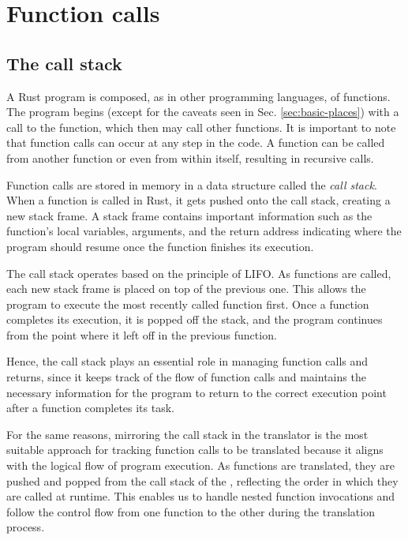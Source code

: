 \section{Function calls}

\subsection{The call stack}

A Rust program is composed, as in other programming languages, of functions.
The program begins (except for the caveats seen in Sec. \ref{sec:basic-places})
with a call to the  function, which then may call other functions.
It is important to note that function calls can occur at any step in the code.
A function can be called from another function or even from within itself, resulting in recursive calls.

Function calls are stored in memory in a data structure called the \emph{call stack}.
When a function is called in Rust, it gets pushed onto the call stack, creating a new stack frame.
A stack frame contains important information such as the function's local variables, arguments,
and the return address indicating where the program should resume once the function finishes its execution.

The call stack operates based on the principle of \acrfull{LIFO}.
As functions are called, each new stack frame is placed on top of the previous one.
This allows the program to execute the most recently called function first.
Once a function completes its execution, it is popped off the stack,
and the program continues from the point where it left off in the previous function.

Hence, the call stack plays an essential role in managing function calls and returns,
since it keeps track of the flow of function calls and maintains the necessary information
for the program to return to the correct execution point after a function completes its task.

For the same reasons, mirroring the call stack in the translator
is the most suitable approach for tracking function calls to be translated
because it aligns with the logical flow of program execution.
As functions are translated, they are pushed and popped
from the call stack of the ,
reflecting the order in which they are called at runtime.
This enables us to handle nested function invocations and
follow the control flow from one function to the other during the translation process.

